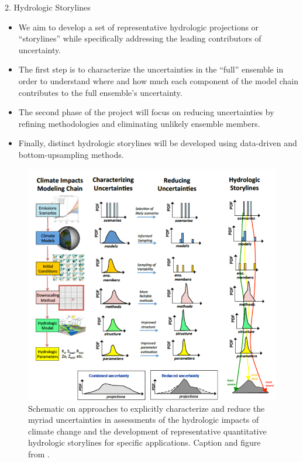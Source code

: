\documentclass{beamer}
\begin{document}
\begin{frame}{}
\begin{columns}
\begin{column}{.3333\paperwidth}
\begin{textblock}{\textwidth \TPHorizModule}
\begin{block}{2. Hydrologic Storylines}
\begin{itemize}
      \item We aim to develop a set of representative hydrologic projections or ``storylines'' while specifically addressing the leading contributors of uncertainty.
      \item The first step is to characterize the uncertainties in the ``full'' ensemble in order to understand where and how much each component of the model chain contributes to the full ensemble's uncertainty.
      \item The second phase of the project will focus on reducing uncertainties by refining methodologies and eliminating unlikely ensemble members.
      \item Finally, distinct hydrologic storylines will be developed using data-driven and bottom-upsampling methods.

     \end{itemize}

     \begin{figure}
      \center\includegraphics[width=\linewidth]{figures/storylines_diag.png}
      \caption{Schematic on approaches to explicitly characterize and reduce the myriad uncertainties in assessments of the hydrologic impacts of climate change and the development of representative quantitative hydrologic storylines for specific applications. Caption and figure from \citep{Clark_2016}.
       \label{fig:storylines}}
     \end{figure}


\end{block}
\end{textblock}
\end{column}
\end{columns}
\end{frame}
\end{document}
